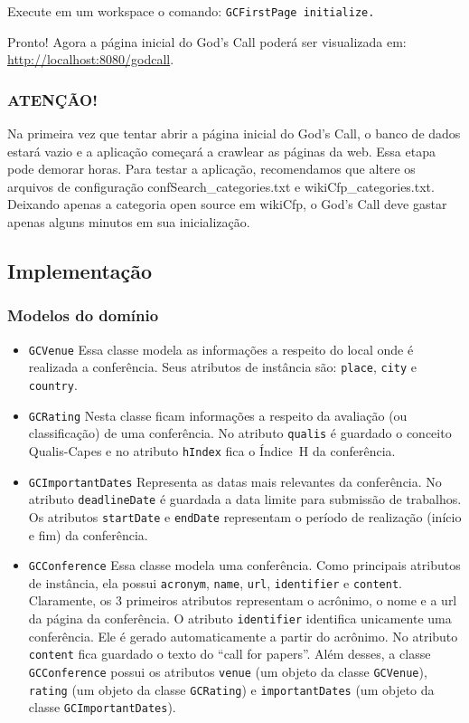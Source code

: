 Execute em um workspace o comando: \texttt{GCFirstPage initialize.}

Pronto! Agora a página inicial do God's Call poderá ser visualizada em: \url{http://localhost:8080/godcall}.

\subsubsection{ATENÇÃO!}

Na primeira vez que tentar abrir a página inicial do God's Call, o banco de dados estará vazio e a aplicação começará a crawlear as páginas da web. Essa etapa pode demorar horas. Para testar a aplicação, recomendamos que altere os arquivos de configuração confSearch\_categories.txt e wikiCfp\_categories.txt. Deixando apenas a categoria open source em wikiCfp, o God's Call deve gastar apenas alguns minutos em sua inicialização.


\subsection{Implementação}

\subsubsection{Modelos do domínio}%
\begin{itemize}
    \item \texttt{GCVenue} Essa classe modela as informações a respeito do local onde é realizada a conferência. Seus atributos de instância são: \texttt{place}, \texttt{city} e  \texttt{country}.
    \item \texttt{GCRating} Nesta classe ficam informações a respeito da avaliação (ou classificação) de uma conferência. No atributo \texttt{qualis} é guardado o conceito Qualis-Capes e no atributo \texttt{hIndex} fica o Índice~H da conferência. 
    \item \texttt{GCImportantDates} Representa as datas mais relevantes da conferência. No atributo \texttt{deadlineDate} é guardada a data limite para submissão de trabalhos. Os atributos \texttt{startDate} e \texttt{endDate} representam o período de realização (início e fim) da conferência.
    \item \texttt{GCConference} Essa classe modela uma conferência. Como principais atributos de instância, ela possui  \texttt{acronym}, \texttt{name}, \texttt{url}, \texttt{identifier} e \texttt{content}. Claramente, os 3 primeiros atributos representam o acrônimo, o nome e a url da página da conferência. O atributo \texttt{identifier} identifica unicamente uma conferência. Ele é gerado automaticamente a partir do acrônimo. No atributo \texttt{content} fica guardado o texto do ``call for papers''.
Além desses, a classe \texttt{GCConference} possui os atributos \texttt{venue} (um objeto da classe \texttt{GCVenue}), \texttt{rating} (um objeto da classe \texttt{GCRating}) e \texttt{importantDates} (um objeto da classe \texttt{GCImportantDates}).
\end{itemize}


